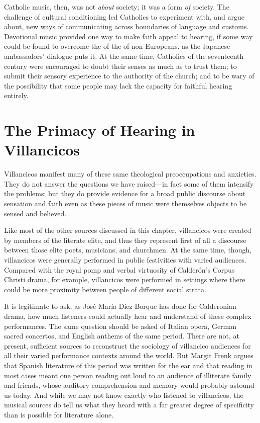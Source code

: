 Catholic music, then, was not \emph{about} society; it was a form \emph{of} 
society.
The challenge of cultural conditioning led Catholics to experiment with, and 
argue about, new ways of communicating across boundaries of language and 
customs.
Devotional music provided one way to make faith appeal to hearing, if some way
could be found to overcome the  of the  of non-Europeans, as the Japanese
ambassadors' dialogue puts it.
At the same time, Catholics of the seventeenth century were encouraged to doubt 
their senses as much as to trust them; to submit their sensory experience to 
the authority of the church; and to be wary of the possibility that some people 
may lack the capacity for faithful hearing entirely.

\section{The Primacy of Hearing in Villancicos}

Villancicos manifest many of these same theological preoccupations and 
anxieties.
They do not answer the questions we have raised---in fact some of them 
intensify the problems; but they do provide evidence for a broad public 
discourse about sensation and faith even as these pieces of music were 
themselves objects to be sensed and believed.

Like most of the other sources discussed in this chapter, villancicos were 
created by members of the literate elite, and thus they represent first of all 
a discourse between those elite poets, musicians, and churchmen.
At the same time, though, villancicos were generally performed in public 
festivities with varied audiences.
Compared with the royal pomp and verbal virtuosity of Calderón's Corpus Christi 
drama, for example, villancicos were performed in settings where there could be 
more proximity between people of different social strata.

It is legitimate to ask, as José María Díez Borque has done for Calderonian 
drama, how much listeners could actually hear and understand of these complex 
performances.%
    \Autocite{DiezBorque:Publico}
The same question should be asked of Italian opera, German sacred concertos, 
and English anthems of the same period.
There are not, at present, sufficient sources to reconstruct the sociology of 
villancico audiences for all their varied performance contexts around the world.
But Margit Frenk argues that Spanish literature of this period was written for 
the ear and that reading in most cases meant one person reading out loud to an 
audience of illiterate family and friends, whose auditory comprehension and 
memory would probably astound us today.%
    \Autocite{Frenk:Voz}
And while we may not know exactly who listened to villancicos, the musical 
sources do tell us what they heard with a far greater degree of specificity 
than is possible for literature alone.

